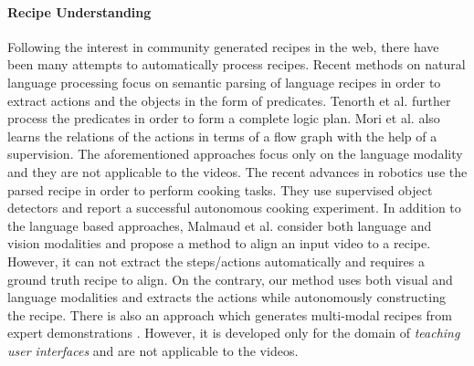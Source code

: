 \paragraph{Recipe Understanding}
Following the interest in community generated recipes in the web, there have been many attempts to automatically process recipes. Recent methods on natural language processing \cite{cookingSemantics,logicRecipe} focus on semantic parsing of language recipes in order to extract actions and the objects in the form of predicates. Tenorth et al.\cite{logicRecipe} further process the predicates in order to form a complete logic plan. Mori et al.\cite{flowGraph} also learns the relations of the actions in terms of a flow graph with the help of a supervision. The aforementioned approaches focus only on the language modality and they are not applicable to the videos. The recent advances \cite{beetz,cookie} in robotics use the parsed recipe in order to perform cooking tasks. They use supervised object detectors and report a successful autonomous cooking experiment. In addition to the language based approaches, Malmaud et al.\cite{alignment} consider both language and vision modalities and propose a method to align an input video to a recipe. However, it can not extract the steps/actions automatically and requires a ground truth recipe to align. On the contrary, our method uses both visual and language modalities and extracts the actions while autonomously constructing the recipe. There is also an approach which generates multi-modal recipes from expert demonstrations \cite{photoshop}. However, it is developed only for the domain of \emph{teaching user interfaces} and are not applicable to the videos.
